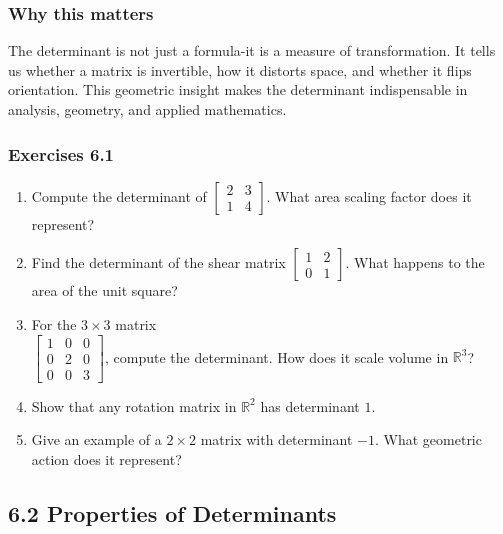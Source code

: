 \documentclass[
  12pt,
  a4paper,
]{article}
\begin{document}
\subsubsection{Why this matters}\label{why-this-matters-20}

The determinant is not just a formula-it is a measure of transformation.
It tells us whether a matrix is invertible, how it distorts space, and
whether it flips orientation. This geometric insight makes the
determinant indispensable in analysis, geometry, and applied
mathematics.

\subsubsection{Exercises 6.1}\label{exercises-61}

\begin{enumerate}
\def\labelenumi{\arabic{enumi}.}
\item
  Compute the determinant of
  \(\begin{bmatrix} 2 & 3 \\ 1 & 4 \end{bmatrix}\). What area scaling
  factor does it represent?
\item
  Find the determinant of the shear matrix
  \(\begin{bmatrix} 1 & 2 \\ 0 & 1 \end{bmatrix}\). What happens to the
  area of the unit square?
\item
  For the \(3 \times 3\) matrix\\
  \(\begin{bmatrix} 1 & 0 & 0 \\ 0 & 2 & 0 \\ 0 & 0 & 3 \end{bmatrix}\),
  compute the determinant. How does it scale volume in \(\mathbb{R}^3\)?
\item
  Show that any rotation matrix in \(\mathbb{R}^2\) has determinant
  \(1\).
\item
  Give an example of a \(2 \times 2\) matrix with determinant \(-1\).
  What geometric action does it represent?
\end{enumerate}

\subsection{6.2 Properties of
Determinants}\label{62-properties-of-determinants}
\end{document}
